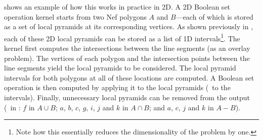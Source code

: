  shows an example of how this works in practice in 2D.
A 2D Boolean set operation kernel starts from two Nef polygons $A$ and $B$---each of which is stored as a set of local pyramids at its corresponding vertices.
As shown previously in , each of these 2D local pyramids can be stored as a list of 1D intervals\footnote{Note how this essentially reduces the dimensionality of the problem by one.}.
The kernel first computes the intersections between the line segments (as an overlay problem).
The vertices of each polygon and the intersection points between the line segments yield the local pyramids to be considered.
The local pyramid intervals for both polygons at all of these locations are computed.
A Boolean set operation is then computed by applying it to the local pyramids (\ie\ to the intervals).
Finally, unnecessary local pyramids can be removed from the output (\eg\ in : $f$ in $A \cup B$; $a$, $b$, $c$, $g$, $i$, $j$ and $k$ in $A \cap B$; and $a$, $c$, $j$ and $k$ in $A - B$).
